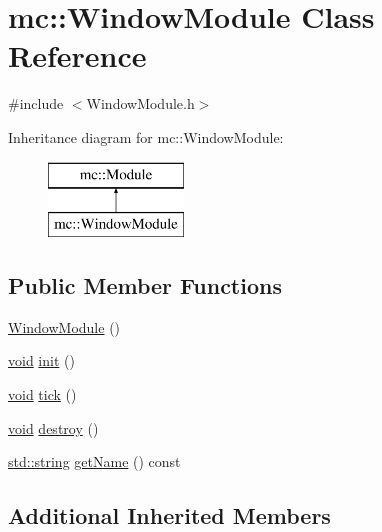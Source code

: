 \hypertarget{classmc_1_1_window_module}{}\section{mc\+:\+:Window\+Module Class Reference}
\label{classmc_1_1_window_module}


{\ttfamily \#include $<$Window\+Module.\+h$>$}

Inheritance diagram for mc\+:\+:Window\+Module\+:\begin{figure}[H]
\begin{center}
\leavevmode
\includegraphics[height=2.000000cm]{classmc_1_1_window_module}
\end{center}
\end{figure}
\subsection*{Public Member Functions}
\begin{DoxyCompactItemize}
\item 
\hyperlink{classmc_1_1_window_module_a85f94176313ad80fde169a9034e75c78}{Window\+Module} ()
\item 
\hyperlink{_s_d_l__opengles2__gl2ext_8h_ae5d8fa23ad07c48bb609509eae494c95}{void} \hyperlink{classmc_1_1_window_module_acdc406a66ee7ab44277953b8429642ca}{init} ()
\item 
\hyperlink{_s_d_l__opengles2__gl2ext_8h_ae5d8fa23ad07c48bb609509eae494c95}{void} \hyperlink{classmc_1_1_window_module_ab9f6b46fe2624f52ed69188d5be94066}{tick} ()
\item 
\hyperlink{_s_d_l__opengles2__gl2ext_8h_ae5d8fa23ad07c48bb609509eae494c95}{void} \hyperlink{classmc_1_1_window_module_a4ad68d037b1ed9aa8740d01a0c2f3762}{destroy} ()
\item 
\hyperlink{_s_d_l__opengl__glext_8h_ae84541b4f3d8e1ea24ec0f466a8c568b}{std\+::string} \hyperlink{classmc_1_1_window_module_a69600ab76f3427c509594916abde0d37}{get\+Name} () const 
\end{DoxyCompactItemize}
\subsection*{Additional Inherited Members}


